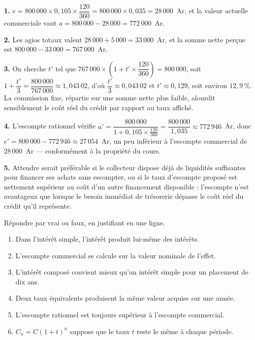 \begin{corrige}
\textbf{1.} $e = 800\,000 \times 0{,}105 \times \dfrac{120}{360}
= 800\,000 \times 0{,}035 = 28\,000$~Ar, et la valeur actuelle commerciale
vaut $a = 800\,000-28\,000 = 772\,000$~Ar.

\textbf{2.} Les agios totaux valent $28\,000+5\,000 = 33\,000$~Ar, et la
somme nette perçue est $800\,000-33\,000 = 767\,000$~Ar.

\textbf{3.} On cherche $t'$ tel que
$767\,000 \times \left(1+t' \times \dfrac{120}{360}\right) = 800\,000$,
soit $1+\dfrac{t'}{3} = \dfrac{800\,000}{767\,000} \approx 1{,}043\,02$,
d'où $\dfrac{t'}{3} \approx 0{,}043\,02$ et $t' \approx 0{,}129$, soit
environ $12{,}9\,\%$. La commission fixe, répartie sur une somme nette plus
faible, alourdit sensiblement le coût réel du crédit par rapport au taux
affiché.

\textbf{4.} L'escompte rationnel vérifie
$a' = \dfrac{800\,000}{1+0{,}105 \times \frac{120}{360}}
= \dfrac{800\,000}{1{,}035} \approx 772\,946$~Ar, donc
$e' = 800\,000-772\,946 \approx 27\,054$~Ar, un peu inférieur à l'escompte
commercial de $28\,000$~Ar — conformément à la propriété du cours.

\textbf{5.} Attendre serait préférable si le collecteur dispose déjà de
liquidités suffisantes pour financer ses achats sans escompter, ou si le taux
d'escompte proposé est nettement supérieur au coût d'un autre financement
disponible : l'escompte n'est avantageux que lorsque le besoin immédiat de
trésorerie dépasse le coût réel du crédit qu'il représente.
\end{corrige}

\begin{jemeteste}
Répondre par vrai ou faux, en justifiant en une ligne.

\begin{enumerate}[label=\textbf{\arabic*.}, leftmargin=*, itemsep=0.28em]
  \item Dans l'intérêt simple, l'intérêt produit lui-même des intérêts.
  \item L'escompte commercial se calcule sur la valeur nominale de l'effet.
  \item L'intérêt composé convient mieux qu'un intérêt simple pour un
        placement de dix ans.
  \item Deux taux équivalents produisent la même valeur acquise sur une
        année.
  \item L'escompte rationnel est toujours supérieur à l'escompte commercial.
  \item $C_{n} = C(1+t)^{n}$ suppose que le taux $t$ reste le même à chaque
        période.
\end{enumerate}
\end{jemeteste}

